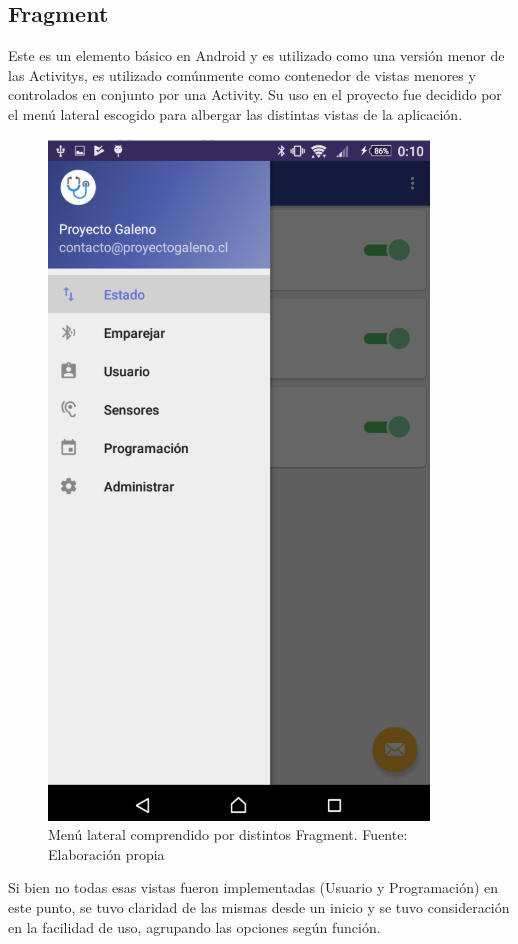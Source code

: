 \subsection{Fragment}

Este es un elemento básico en Android y es utilizado como una versión menor de las Activitys, es utilizado comúnmente como contenedor de vistas menores y controlados en conjunto por una Activity.
Su uso en el proyecto fue decidido por el menú lateral escogido para albergar las distintas vistas de la aplicación.

\begin{figure}[H]
	\centering
	\includegraphics[scale=1]{figuras/proto1/fragment.png}
	\caption{Menú lateral comprendido por distintos Fragment. Fuente: Elaboración propia}
	\label{fragment}
\end{figure}

Si bien no todas esas vistas fueron implementadas (Usuario y Programación) en este punto, se tuvo claridad de las mismas desde un inicio y se tuvo consideración en la facilidad de uso, agrupando las opciones según función.

